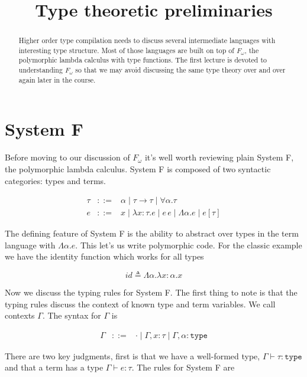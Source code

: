 \documentclass{amsart}
\title{Type theoretic preliminaries}
\newcommand{\type}{\ensuremath{\mathtt{type}}}
\begin{document}
\maketitle

\begin{abstract}
  Higher order type compilation needs to discuss several intermediate languages
  with interesting type structure. Most of those languages are built on top of
  $F_\omega$, the polymorphic lambda calculus with type functions. The first
  lecture is devoted to understanding $F_\omega$ so that we may avoid discussing
  the same type theory over and over again later in the course.
\end{abstract}

\section{System F}

Before moving to our discussion of $F_\omega$ it's well worth
reviewing plain System F, the polymorphic lambda calculus. System F is
composed of two syntactic categories: types and terms.

\[
\begin{array}{lcl}
  \tau & ::= & \alpha \mid \tau \to \tau \mid \forall \alpha. \tau\\
  e & ::= & x \mid \lambda x : \tau. e \mid e \, e \mid
            \Lambda \alpha. e \mid e[\tau]
\end{array}
\]

The defining feature of System F is the ability to abstract over types
in the term language with $\Lambda \alpha. e$. This let's us write
polymorphic code. For the classic example we have the identity
function which works for all types

\[
  id \triangleq \Lambda \alpha. \lambda x : \alpha. x
\]

Now we discuss the typing rules for System F. The first thing to note
is that the typing rules discuss the context of known type and term
variables. We call contexts $\Gamma$. The syntax for $\Gamma$ is

\[
\begin{array}{lcl}
  \Gamma & ::= & \cdot \mid \Gamma, x : \tau \mid \Gamma, \alpha : \type
\end{array}
\]

There are two key
judgments, first is that we have a well-formed type, $\Gamma \vdash
\tau : \type$ and that a term has a type $\Gamma \vdash e : \tau$. The
rules for System F are
\end{document}
